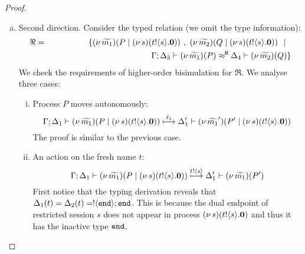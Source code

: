 \begin{proof}
\begin{enumerate}[$-$]
\begin{enumerate}[a)]
		\item	Second direction. Consider the typed relation (we omit the type information):
				\begin{eqnarray*}
					\Re &=& \set{	\newsp{\widetilde{m_1}}{P \Par \newsp{s}{\bout{t}{s} \inact}}\ , \ 
									\newsp{\widetilde{m_2}}{Q \Par \newsp{s}{\bout{t}{s} \inact}} \setbar\\
					&&
									\qquad \qquad \qquad \qquad \qquad \qquad \horel{\Gamma}{\Delta_3}{\newsp{\widetilde{m_1}}{P  } }
									{\hwb}
									{\Delta_4}{\newsp{\widetilde{m_2}}{Q  } }
					}	
				\end{eqnarray*}
				We check the requirements of higher-order bisimulation
				for $\Re$.
				We analyse three cases:
				\begin{enumerate}[i)]
					\item Process $P$ moves autonomously:
							\[
								\Gamma; \Delta_1 \vdash (\nu\, \widetilde{m_1})(P \;|\; (\nu\, s)(t ! \langle s \rangle . \mathbf{0})  )  \stackrel{\ell_1}{\longmapsto} \Delta_1' \vdash (\nu\, \widetilde{m_1}')(P' \;|\; (\nu\, s)(t ! \langle s \rangle . \mathbf{0}))
							\]
							The proof is similar to the previous case.

					\item An action on the fresh name $t$:
					\[
								\Gamma; \Delta_1 \vdash (\nu\, \widetilde{m_1})(P \;|\; (\nu\, s)(t ! \langle s \rangle . \mathbf{0})  )  \stackrel{t ! \langle s \rangle}{\longmapsto}  \Delta_1' \vdash (\nu\, \widetilde{m_1})(P')
							\]
							First notice that the typing derivation
							reveals that $\Delta_1(t) = \Delta_2(t) = ! \langle \mathtt{end} \rangle ; \mathtt{end}$.
							This is because the dual endpoint of restricted session $s$ does not appear
							in process $(\nu\, s)(t ! \langle s \rangle . \mathbf{0})$ and thus it has the inactive type $\mathtt{end}$.


\end{enumerate}
\end{enumerate}
\end{enumerate}
\end{proof}
